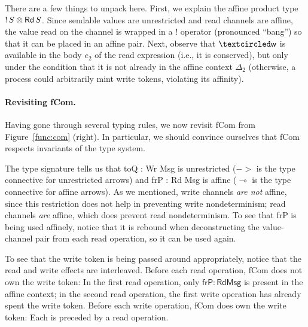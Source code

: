 There are a few things to unpack here. First, we explain the affine product type
${{!}\,{S}}\otimes{{\textnormal{\textsf{Rd}}\,S}}$. Since sendable values are unrestricted
and read channels are affine, the value read on the channel is wrapped in a $!$
operator (pronounced ``bang'') so that it can be placed in an affine pair. Next,
observe that $\wrtok$ is available in the body $e_2$ of the read expression
(i.e., it is conserved), but only under the condition that it is not already in
the affine context $\Delta_2$ (otherwise, a process could arbitrarily mint write
tokens, violating its affinity).

\paragraph{Revisiting \textsf{fCom}.} Having gone through several typing rules, we now revisit \textsf{fCom} from
Figure~\ref{func:com} (right). In particular, we should convince ourselves that
\textsf{fCom} respects invariants of the type system.

The type signature tells us that \textsf{toQ : Wr Msg} is unrestricted ($->$
is the type connective for unrestricted arrows) and \textsf{frP : Rd Msg} is
affine ($\multimap$ is the type connective for affine arrows). As we mentioned, write
channels \emph{are not} affine, since this restriction does not help in
preventing write nondeterminism; read channels \emph{are} affine, which does
prevent read nondeterminism. To see that \textsf{frP} is being used affinely,
notice that it is rebound when deconstructing the value-channel pair from each
read operation, so it can be used again.

To see that the write token is being passed around appropriately, notice that
the read and write effects are interleaved. Before each read operation,
\textsf{fCom} does not own the write token: In the first read operation, only
$\mathsf{frP} : \mathsf{Rd Msg}$ is present in the affine context; in the second
read operation, the first write operation has already spent the write
token. Before each write operation, \textsf{fCom} does own the write token: Each
is preceded by a read operation.


